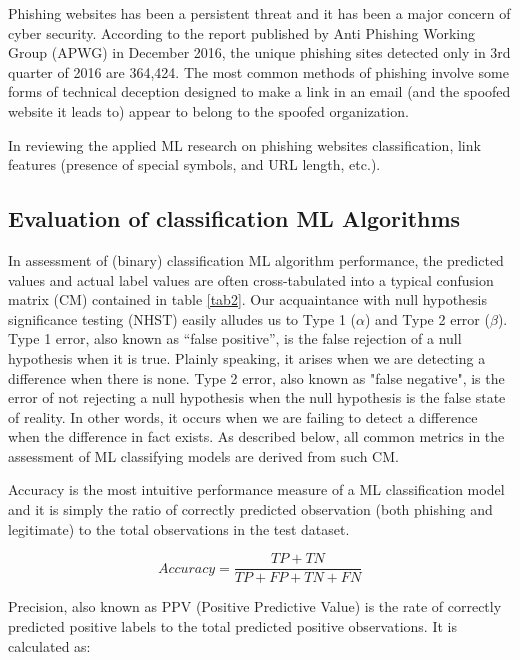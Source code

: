 \documentclass[deca,nonblindrev]{informs3} %
\begin{document}
Phishing websites has been a persistent threat and it has been a major concern of cyber security.  According to the report published by Anti Phishing Working Group (APWG) in December 2016, the unique phishing sites detected only in 3rd quarter of 2016 are 364,424. The most common methods of phishing involve some forms of technical deception designed to make a link in an email (and the spoofed website it leads to) appear to belong to the spoofed organization. 

In reviewing the applied ML research on phishing websites classification,    link features (presence of special symbols, and URL length, etc.).

 



\subsection{Evaluation of classification  ML Algorithms}

In assessment of (binary) classification  ML algorithm performance, the predicted  values and actual label values  are often cross-tabulated into  a typical confusion matrix (CM) contained in  table \ref{tab2}. Our acquaintance with null hypothesis  significance  testing (NHST) easily alludes us to Type 1 ($\alpha$) and  Type 2 error ($\beta$). Type 1 error,  also known as “false positive”, is the false rejection of a null hypothesis when it is true. Plainly speaking, it arises when we are detecting a difference when there is none. Type 2  error, also known as "false negative", is the error of not rejecting a null hypothesis when the null hypothesis is the false state of reality. In other words, it occurs when we are failing to detect a difference when the difference in fact exists. As described below, all common metrics in the assessment of ML classifying models are derived from such CM.

Accuracy is the most intuitive performance measure of a ML classification model  and it is simply the ratio of correctly predicted observation (both phishing and legitimate) to the total observations in the test dataset.

\begin{equation}
Accuracy = \frac {TP+TN}{TP+FP+TN+FN}
\end{equation}

Precision, also known as PPV (Positive Predictive Value) is the rate of correctly predicted positive labels to the total predicted positive observations.  It is calculated as:
\end{document}
